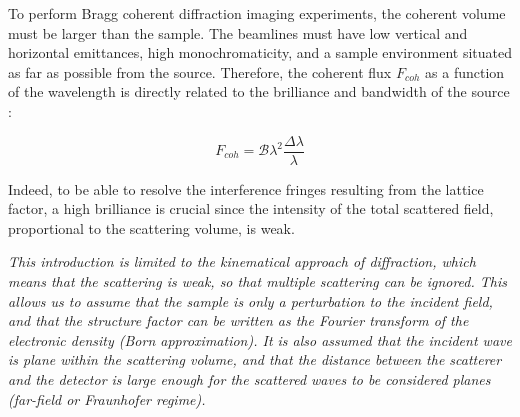 To perform Bragg coherent diffraction imaging experiments, the coherent volume must be larger than the sample.
The beamlines must have low vertical and horizontal emittances, high monochromaticity, and a sample environment situated as far as possible from the source.
Therefore, the coherent flux $F_{coh}$ as a function of the wavelength is directly related to the brilliance and bandwidth of the source \parencite{Willmott}:

\begin{equation}
    \label{eq:CoherentFlux}
    F_{coh} = \mathcal{B} \lambda^2 \frac{\Delta \lambda}{\lambda}
\end{equation}

Indeed, to be able to resolve the interference fringes resulting from the lattice factor, a high brilliance is crucial since the intensity of the total scattered field, proportional to the scattering volume, is weak.

\textit{
This introduction is limited to the kinematical approach of diffraction, which means that the scattering is weak, so that multiple scattering can be ignored.
This allows us to assume that the sample is only a perturbation to the incident field, and that the structure factor can be written as the Fourier transform of the electronic density (Born approximation).
It is also assumed that the incident wave is plane within the scattering volume, and that the distance between the scatterer and the detector is large enough for the scattered waves to be considered planes (far-field or Fraunhofer regime).
}
